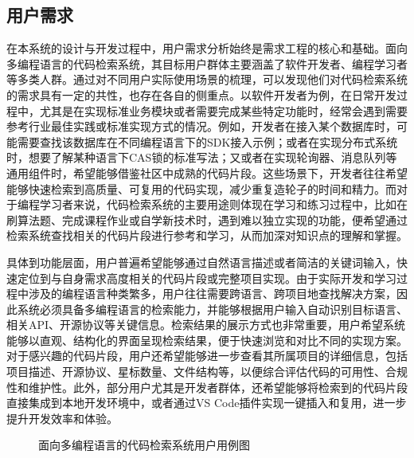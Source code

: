 \documentclass[UTF8,a4paper,12pt]{ctexart}
\numberwithin{equation}{section}
\begin{document}
\subsection{用户需求}
在本系统的设计与开发过程中，用户需求分析始终是需求工程的核心和基础。面向多编程语言的代码检索系统，其目标用户群体主要涵盖了软件开发者、编程学习者等多类人群。通过对不同用户实际使用场景的梳理，可以发现他们对代码检索系统的需求具有一定的共性，也存在各自的侧重点。以软件开发者为例，在日常开发过程中，尤其是在实现标准业务模块或者需要完成某些特定功能时，经常会遇到需要参考行业最佳实践或标准实现方式的情况。例如，开发者在接入某个数据库时，可能需要查找该数据库在不同编程语言下的SDK接入示例；或者在实现分布式系统时，想要了解某种语言下CAS锁的标准写法；又或者在实现轮询器、消息队列等通用组件时，希望能够借鉴社区中成熟的代码片段。这些场景下，开发者往往希望能够快速检索到高质量、可复用的代码实现，减少重复造轮子的时间和精力。而对于编程学习者来说，代码检索系统的主要用途则体现在学习和练习过程中，比如在刷算法题、完成课程作业或自学新技术时，遇到难以独立实现的功能，便希望通过检索系统查找相关的代码片段进行参考和学习，从而加深对知识点的理解和掌握。\par
具体到功能层面，用户普遍希望能够通过自然语言描述或者简洁的关键词输入，快速定位到与自身需求高度相关的代码片段或完整项目实现。由于实际开发和学习过程中涉及的编程语言种类繁多，用户往往需要跨语言、跨项目地查找解决方案，因此系统必须具备多编程语言的检索能力，并能够根据用户输入自动识别目标语言、相关API、开源协议等关键信息。检索结果的展示方式也非常重要，用户希望系统能够以直观、结构化的界面呈现检索结果，便于快速浏览和对比不同的实现方案。对于感兴趣的代码片段，用户还希望能够进一步查看其所属项目的详细信息，包括项目描述、开源协议、星标数量、文件结构等，以便综合评估代码的可用性、合规性和维护性。此外，部分用户尤其是开发者群体，还希望能够将检索到的代码片段直接集成到本地开发环境中，或者通过VS Code插件实现一键插入和复用，进一步提升开发效率和体验。\par
\begin{figure}[H]
	\caption{面向多编程语言的代码检索系统用户用例图}
	\label{usecase}
\end{figure}
\end{document}
